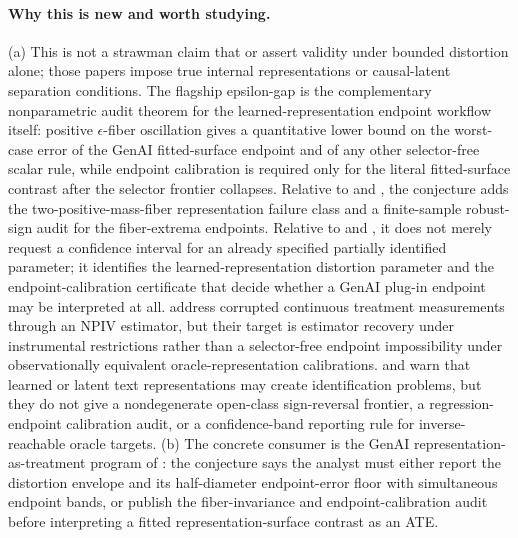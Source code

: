 \documentclass[11pt]{article}
\theoremstyle{definition}
\theoremstyle{plain}
\theoremstyle{remark}
\begin{document}
\paragraph{Why this is new and worth studying.}
(a) This is not a strawman claim that \citet{ImaiNakamura2024TextTreatments} or \citet{CorcollAndreuVlontzosORiordanGilliganLee2026} assert validity under bounded distortion alone; those papers impose true internal representations or causal-latent separation conditions.  The flagship epsilon-gap is the complementary nonparametric audit theorem for the learned-representation endpoint workflow itself: positive \(\epsilon\)-fiber oscillation gives a quantitative lower bound on the worst-case error of the GenAI fitted-surface endpoint and of any other selector-free scalar rule, while endpoint calibration is required only for the literal fitted-surface contrast after the selector frontier collapses.  Relative to \citet{ManskiTamer2002} and \citet{BeresteanuMolchanovMolinari2012}, the conjecture adds the two-positive-mass-fiber representation failure class and a finite-sample robust-sign audit for the fiber-extrema endpoints.  Relative to \citet{ImbensManski2004} and \citet{Stoye2009}, it does not merely request a confidence interval for an already specified partially identified parameter; it identifies the learned-representation distortion parameter and the endpoint-calibration certificate that decide whether a GenAI plug-in endpoint may be interpreted at all.  \citet{ZhuGultchinGrettonKusnerSilva2022} address corrupted continuous treatment measurements through an NPIV estimator, but their target is estimator recovery under instrumental restrictions rather than a selector-free endpoint impossibility under observationally equivalent oracle-representation calibrations.  \citet{EgamiFongGrimmerRobertsStewart2022} and \citet{FongGrimmer2023} warn that learned or latent text representations may create identification problems, but they do not give a nondegenerate open-class sign-reversal frontier, a regression-endpoint calibration audit, or a confidence-band reporting rule for inverse-reachable oracle targets.  (b) The concrete consumer is the GenAI representation-as-treatment program of \citet{ImaiNakamura2024TextTreatments}: the conjecture says the analyst must either report the distortion envelope and its half-diameter endpoint-error floor with simultaneous endpoint bands, or publish the fiber-invariance and endpoint-calibration audit before interpreting a fitted representation-surface contrast as an ATE.
\end{document}
